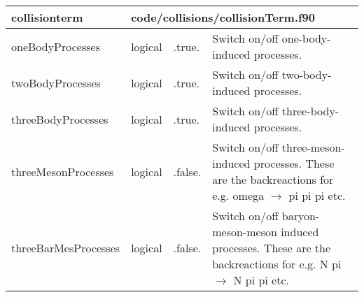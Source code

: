 \documentclass{article}
\begin{document}
\begin{longtable}{llll}
\toprule
\textbf{\large{collisionterm}} & \multicolumn{3}{l}{\footnotesize{code/collisions/collisionTerm.f90}}\\*
\midrule
\endfirsthead
\midrule
\endhead
oneBodyProcesses & \begin{minipage}[t]{2cm}logical\end{minipage} & \begin{minipage}[t]{2cm}.true.\end{minipage} & \begin{minipage}[t]{12cm}Switch on/off one-body-induced processes.\end{minipage}\\*
\midrule
twoBodyProcesses & \begin{minipage}[t]{2cm}logical\end{minipage} & \begin{minipage}[t]{2cm}.true.\end{minipage} & \begin{minipage}[t]{12cm}Switch on/off two-body-induced processes.\end{minipage}\\*
\midrule
threeBodyProcesses & \begin{minipage}[t]{2cm}logical\end{minipage} & \begin{minipage}[t]{2cm}.true.\end{minipage} & \begin{minipage}[t]{12cm}Switch on/off three-body-induced processes.\end{minipage}\\*
\midrule
threeMesonProcesses & \begin{minipage}[t]{2cm}logical\end{minipage} & \begin{minipage}[t]{2cm}.false.\end{minipage} & \begin{minipage}[t]{12cm}Switch on/off three-meson-induced processes. These are the backreactions for e.g. omega $\rightarrow$ pi pi pi etc.\end{minipage}\\*
\midrule
threeBarMesProcesses & \begin{minipage}[t]{2cm}logical\end{minipage} & \begin{minipage}[t]{2cm}.false.\end{minipage} & \begin{minipage}[t]{12cm}Switch on/off baryon-meson-meson induced processes. These are the backreactions for e.g. N pi $\rightarrow$ N pi pi etc.\end{minipage}\\*

\end{longtable}
\end{document}
